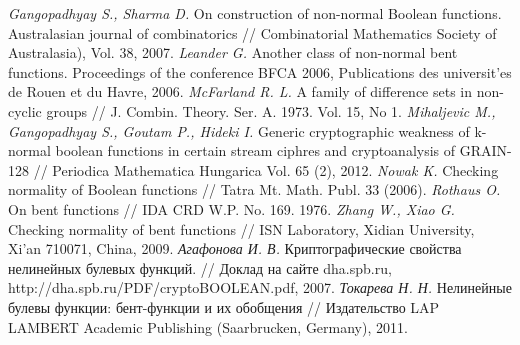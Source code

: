 \begin{thebibliography}{99}
 {\it Gangopadhyay S., Sharma D.} On construction of non-normal Boolean functions. Australasian journal of combinatorics // Combinatorial Mathematics Society of Australasia), Vol. 38, 2007.
 {\it Leander G.} Another class of non-normal bent functions. Proceedings of the conference BFCA 2006, Publications des universit'es de Rouen et du Havre, 2006.
 {\it McFarland R. L.} A family of difference sets in non-cyclic groups // J. Combin. Theory. Ser. A. 1973. Vol. 15, No 1.
 {\it Mihaljevic M., Gangopadhyay S., Goutam P., Hideki I.} Generic cryptographic weakness of k-normal boolean functions in certain stream ciphres and cryptoanalysis of GRAIN-128 // Periodica Mathematica Hungarica Vol. 65 (2), 2012.
 {\it Nowak K.} Checking normality of Boolean functions // Tatra Mt. Math. Publ. 33 (2006).
 {\it Rothaus O.} On bent functions // IDA CRD W.P. No. 169. 1976.
 {\it Zhang W., Xiao G.} Checking normality of bent functions // ISN Laboratory, Xidian University, Xi’an 710071, China, 2009.
 {\it Агафонова И. В.} Криптографические свойства нелинейных булевых функций. // Доклад на сайте dha.spb.ru, http://dha.spb.ru/PDF/cryptoBOOLEAN.pdf, 2007.
 {\it Токарева Н. Н.} Нелинейные булевы функции: бент-функции и их обобщения // Издательство LAP LAMBERT Academic Publishing (Saarbrucken, Germany), 2011.

\end{thebibliography}
